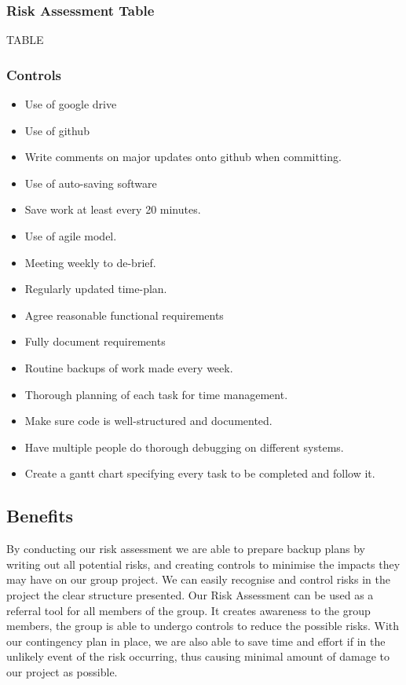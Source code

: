 \documentclass[12pt]{article}
\begin{document}
     
     \subsubsection{Risk Assessment Table}
     
     TABLE
     
     \subsubsection{Controls}
    \begin{itemize}
    
\item Use of google drive
\item Use of github
\item Write comments on major updates onto github when committing.
\item Use of auto-saving software
\item Save work at least every 20 minutes.
\item Use of agile model.
\item Meeting weekly to de-brief.
\item Regularly updated time-plan.
\item Agree reasonable functional requirements
\item Fully document requirements
\item Routine backups of work made every week.
\item Thorough planning of each task for time management.
\item Make sure code is well-structured and documented.
\item Have multiple people do thorough debugging on different systems.
\item Create a gantt chart specifying every task to be completed and follow it. 
\end{itemize}

\subsection{Benefits}

By conducting our risk assessment we are able to prepare backup plans by writing out all potential risks, and creating controls to minimise the impacts they may have on our group project. We can easily recognise and control risks in the project the clear structure presented. Our Risk Assessment can be used as a referral tool for all members of the group. It creates awareness to the group members, the group is able to undergo controls to reduce the possible risks. With our contingency plan in place, we are also able to save time and effort if in the unlikely event of the risk occurring, thus causing minimal amount of damage to our project as possible. 
\end{document}
